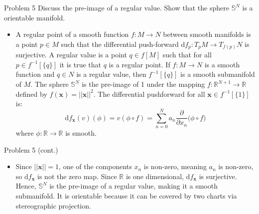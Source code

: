 \documentclass{beamer}
\begin{document}
    \begin{frame}{Problem 5}
        Discuss the pre-image of a regular value. Show that the sphere
        $\mathbb{S}^{N}$ is a orientable manifold.
        \begin{itemize}
            \item A regular point of a smooth function
                $f:M\rightarrow{N}$ between smooth manifolds is a point
                $p\in{M}$ such that the differential push-forward
                $\textrm{d}f_{p}:T_{p}M\rightarrow{T}_{f(p)}N$ is surjective.
                A regular value is a point $q\in{f[M]}$ such that for all
                $p\in{f}^{-1}[\{q\}]$ it is true that $q$ is a regular point.
                If $f:M\rightarrow{N}$ is a smooth function and $q\in{N}$ is a
                regular value, then $f^{-1}[\{q\}]$ is a smooth submanifold of
                $M$. The sphere $\mathbb{S}^{N}$ is the pre-image of 1 under
                the mapping $f:\mathbb{R}^{N+1}\rightarrow\mathbb{R}$ defined
                by $f(\mathbf{x})=||\mathbf{x}||^{2}$. The differential
                pushforward for all $\mathbf{x}\in{f}^{-1}[\{1\}]$ is:
                \begin{equation}
                    \textrm{d}f_{\mathbf{x}}(v)(\phi)
                        =v(\phi\circ{f})
                        =\sum_{n=0}^{N}a_{n}\frac{\partial}{\partial{x}_{n}}
                            \Big(\phi\circ{f}\Big)
                \end{equation}
                where $\phi:\mathbb{R}\rightarrow\mathbb{R}$ is smooth.
        \end{itemize}
    \end{frame}
    \begin{frame}{Problem 5 (cont.)}
        \begin{itemize}
            \item Since $||\mathbf{x}||=1$, one of the components $x_{n}$ is
                non-zero, meaning $a_{n}$ is non-zero, so
                $\textrm{d}f_{\mathbf{x}}$ is not the zero map. Since
                $\mathbb{R}$ is one dimensional, $\textrm{d}f_{\mathbf{x}}$ is
                surjective. Hence, $\mathbb{S}^{N}$ is the pre-image of a
                regular value, making it a smooth submanifold. It is orientable
                because it can be covered by two charts via stereographic
                projection.
        \end{itemize}
    \end{frame}
\end{document}
